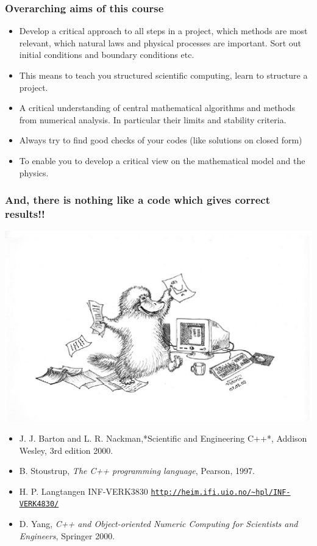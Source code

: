 \documentclass{beamer}
\begin{document}
\begin{frame}
\frametitle{Overarching aims of this course}

\begin{itemize}
  \item Develop a critical approach to all steps in a project, which methods are most relevant, which natural laws and physical processes are important. Sort out initial conditions and boundary conditions etc.

  \item This means to teach you structured scientific computing, learn to structure a project.

  \item A critical understanding of central mathematical algorithms and methods from numerical analysis. In particular their limits and stability criteria.

  \item Always try to find good checks of your codes (like solutions on closed form)

  \item To enable you to develop a critical view on the mathematical model and the physics.
\end{itemize}

\noindent
\end{frame}

\begin{frame}
\frametitle{And, there is nothing like a code which gives correct results!!}

\centerline{\includegraphics[width=0.6\linewidth]{fig-intro/Nebbdyr2.pdf}}



\begin{itemize}
 \item J. J. Barton and L. R. Nackman,*Scientific and Engineering C++*, Addison Wesley, 3rd edition 2000.

 \item B. Stoustrup, \emph{The C++ programming language}, Pearson, 1997.

 \item H. P. Langtangen INF-VERK3830 \href{{http://heim.ifi.uio.no/~hpl/INF-VERK4830/}}{\nolinkurl{http://heim.ifi.uio.no/~hpl/INF-VERK4830/}}

 \item D. Yang, \emph{C++ and Object-oriented Numeric Computing for Scientists and Engineers}, Springer 2000.
\end{itemize}

\noindent
\end{frame}
\end{document}
